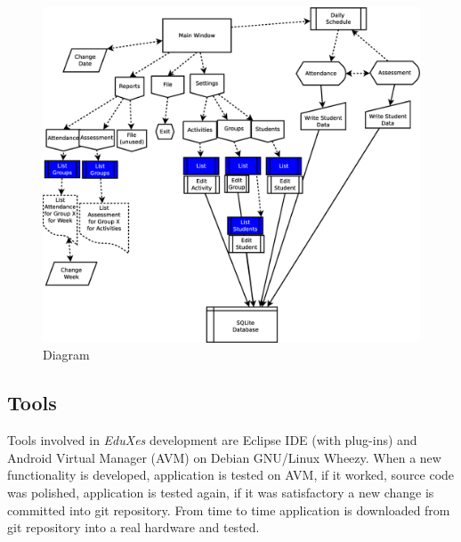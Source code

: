 		\begin{figure}
		    \begin{center}
		        \includegraphics[scale=0.3]{eduxes_diagram.eps}
		        \caption{Diagram}
		        \label{fig:diagram}
		    \end{center}
		\end{figure}
		
\newpage		
  
		\subsection{Tools}
	
	Tools involved in \emph{EduXes} development are Eclipse IDE (with plug-ins)
	 and Android Virtual Manager (AVM) on Debian GNU/Linux Wheezy. When a new functionality
	 is developed, application is tested on AVM,  if it worked, source code was polished, application is tested again, if it was
	  satisfactory a new change is committed into git repository. 
	  From time to time application is downloaded from git repository into a real hardware and tested. 
	
